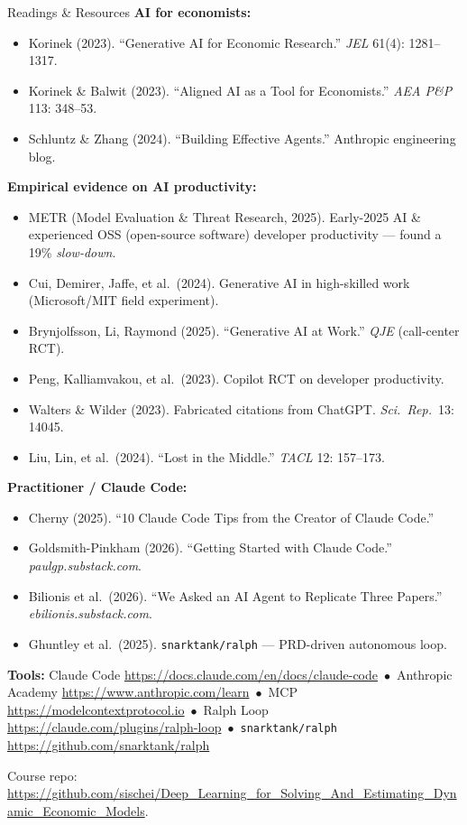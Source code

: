 \documentclass[aspectratio=169,10pt]{beamer}
\begin{document}
\begin{frame}{Readings \& Resources}
\tiny
\textbf{AI for economists:}
\begin{itemize}\itemsep0pt
    \item Korinek (2023). ``Generative AI for Economic Research.'' \emph{JEL} 61(4): 1281--1317.
    \item Korinek \& Balwit (2023). ``Aligned AI as a Tool for Economists.'' \emph{AEA P\&P} 113: 348--53.
    \item Schluntz \& Zhang (2024). ``Building Effective Agents.'' Anthropic engineering blog.
\end{itemize}

\textbf{Empirical evidence on AI productivity:}
\begin{itemize}\itemsep0pt
    \item METR (Model Evaluation \& Threat Research, 2025). Early-2025 AI \& experienced OSS (open-source software) developer productivity --- found a 19\% \emph{slow-down}.
    \item Cui, Demirer, Jaffe, et al.\ (2024). Generative AI in high-skilled work (Microsoft/MIT field experiment).
    \item Brynjolfsson, Li, Raymond (2025). ``Generative AI at Work.'' \emph{QJE} (call-center RCT).
    \item Peng, Kalliamvakou, et al.\ (2023). Copilot RCT on developer productivity.
    \item Walters \& Wilder (2023). Fabricated citations from ChatGPT. \emph{Sci.\ Rep.}\ 13: 14045.
    \item Liu, Lin, et al.\ (2024). ``Lost in the Middle.'' \emph{TACL} 12: 157--173.
\end{itemize}

\textbf{Practitioner / Claude Code:}
\begin{itemize}\itemsep0pt
    \item Cherny (2025). ``10 Claude Code Tips from the Creator of Claude Code.''
    \item Goldsmith-Pinkham (2026). ``Getting Started with Claude Code.'' \emph{paulgp.substack.com}.
    \item Bilionis et al.\ (2026). ``We Asked an AI Agent to Replicate Three Papers.'' \emph{ebilionis.substack.com}.
    \item Ghuntley et al.\ (2025). \texttt{snarktank/ralph} --- PRD-driven autonomous loop.
\end{itemize}

\textbf{Tools:}
Claude Code \url{https://docs.claude.com/en/docs/claude-code} \,$\bullet$\,
Anthropic Academy \url{https://www.anthropic.com/learn} \,$\bullet$\,
MCP \url{https://modelcontextprotocol.io} \,$\bullet$\,
Ralph Loop \url{https://claude.com/plugins/ralph-loop} \,$\bullet$\,
\texttt{snarktank/ralph} \url{https://github.com/snarktank/ralph}

\vspace{0.1em}
Course repo: \url{https://github.com/sischei/Deep_Learning_for_Solving_And_Estimating_Dynamic_Economic_Models}.
\end{frame}
\end{document}
